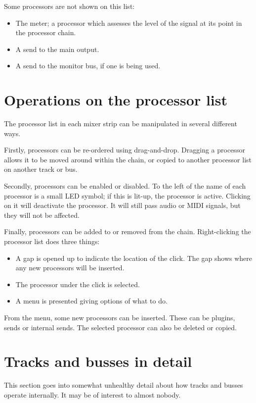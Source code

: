 \documentclass[10pt,a4paper]{book}
\begin{document}
Some processors are not shown on this list:

\begin{itemize}
\item The meter; a processor which assesses the level of the signal at
  its point in the processor chain.
\item A send to the main output.
\item A send to the monitor bus, if one is being used.
\end{itemize}


\section{Operations on the processor list}

The processor list in each mixer strip can be manipulated in several
different ways.

Firstly, processors can be re-ordered using drag-and-drop.  Dragging a
processor allows it to be moved around within the chain, or copied to
another processor list on another track or bus.

Secondly, processors can be enabled or disabled.  To the left of the
name of each processor is a small LED symbol; if this is lit-up, the
processor is active.  Clicking on it will deactivate the processor.
It will still pass audio or MIDI signals, but they will not be
affected.

Finally, processors can be added to or removed from the chain.
Right-clicking the processor list does three things:

\begin{itemize}
\item A gap is opened up to indicate the location of the click.  The
  gap shows where any new processors will be inserted.
\item The processor under the click is selected.
\item A menu is presented giving options of what to do.
\end{itemize}

From the menu, some new processors can be inserted.  These can be
plugins, sends or internal sends.  The selected processor can also be
deleted or copied.

\section{Tracks and busses in detail}

\begin{ddanger}
This section goes into somewhat unhealthy detail about how tracks and
busses operate internally.  It may be of interest to almost nobody.
\end{ddanger}
\end{document}

